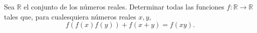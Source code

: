 Sea $\mathbb{R}$ el conjunto de los números reales. Determinar todas las funciones $f : \mathbb{R} \to \mathbb{R}$
tales que, para cualesquiera números reales $x, y$,
\[f(f(x)f(y))+f(x+y)=f(xy).\]